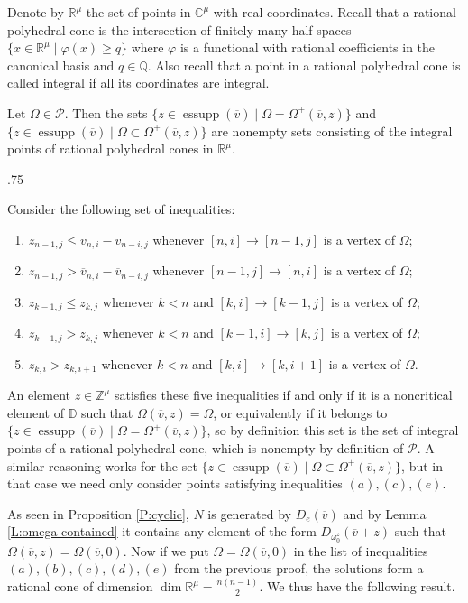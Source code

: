 \documentclass[11pt,fleqn]{amsart}
\makeatletter
\renewcommand\proofname{Proof}
\renewenvironment{proof}[1][\textit{\proofname}]{\par
 \pushQED{\qed}%
 \normalfont \topsep.75\paraskip\relax
 \trivlist
 \item[\hskip\labelsep
 \itshape
 #1\@addpunct{.}]\ignorespaces
}{%
 \popQED\endtrivlist\@endpefalse
}
\newcounter{para}[section]
\newcommand\CC{\mathbb C}
\newcommand\QQ{\mathbb Q}
\newcommand\RR{\mathbb R}
\newcommand\ZZ{\mathbb Z}
\renewcommand\to{\rightarrow}
\renewcommand\phi{\varphi}
\newcommand\vv{\overline{v}}
\DeclareMathOperator\essupp{essupp}
\newcommand\DD{\mathbb D}
\makeatother
\begin{document}
Denote by $\RR^\mu$ the set of points in $\CC^\mu$ with real coordinates. 
Recall that a rational polyhedral cone is the intersection of finitely many
half-spaces $\{x \in \RR^\mu \mid \phi(x) \geq q\}$ where $\phi$ is a 
functional with rational coefficients in the canonical basis and $q \in \QQ$. 
Also recall that a point in a rational polyhedral cone is called integral if 
all its coordinates are integral.
\begin{Lemma}
\label{L:essupp-polyhedra}
Let $\Omega \in \mathcal P$. Then the sets $\{z \in \essupp(\vv) \mid \Omega = 
\Omega^+(\vv,z)\}$ and $\{z \in \essupp(\vv) \mid \Omega \subset 
\Omega^+(\vv,z)\}$ are nonempty sets consisting of the integral points of 
rational polyhedral cones in $\RR^\mu$.
\end{Lemma}
\begin{proof}
Consider the following set of inequalities:
\begin{enumerate}[$(a)$]
\item $z_{n-1,j} \leq \vv_{n,i} - \vv_{n-i,j}$ whenever $[n,i] \to [n-1,j]$ is
a vertex of $\Omega$;

\item $z_{n-1,j} > \vv_{n,i} - \vv_{n-i,j}$ whenever $[n-1,j] \to [n,i]$ is
a vertex of $\Omega$;

\item $z_{k-1,j} \leq z_{k,j}$ whenever $k < n$ and $[k,i] \to [k-1,j]$ is
a vertex of $\Omega$;

\item $z_{k-1,j} > z_{k,j}$ whenever $k < n$ and $[k-1,i] \to [k,j]$ is
a vertex of $\Omega$;

\item $z_{k,i} > z_{k,i+1}$ whenever $k<n$ and $[k,i] \to [k,i+1]$ is a vertex
of $\Omega$.
\end{enumerate}
An element $z \in \ZZ^\mu$ satisfies these five inequalities if and only if it 
is a noncritical element of $\DD$ such that $\Omega(\vv,z) = \Omega$, or 
equivalently if it belongs to $\{z \in \essupp(\vv) \mid \Omega = 
\Omega^+(\vv,z)\}$, so by definition this set is the set of integral points of 
a rational polyhedral cone, which is nonempty by definition of $\mathcal P$. A 
similar reasoning works for the set $\{z \in \essupp(\vv) \mid \Omega \subset 
\Omega^+(\vv,z)\}$, but in that case we need only consider points satisfying 
inequalities $(a), (c), (e)$.
\end{proof}

As seen in Proposition \ref{P:cyclic}, $N$ is generated by $D_e(\vv)$ and 
by Lemma \ref{L:omega-contained} it contains any element of the form 
$D_{\omega_0^z}(\vv + z)$ such that $\Omega(\vv,z) = \Omega(\vv,0)$. Now if we
put $\Omega = \Omega(\vv,0)$ in the list of inequalities $(a), (b), (c), (d), 
(e)$ from the previous proof, the solutions form a rational cone of dimension
$\dim \RR^\mu = \frac{n(n-1)}{2}$. We thus have the following result.
\end{document}
